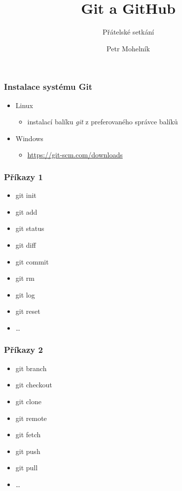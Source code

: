 \documentclass[10pt, compress]{beamer}
\title{Git a GitHub}
\subtitle{Přátelské setkání}
\author{Petr Mohelník}
\institute{}
\begin{document}




\begin{frame}[fragile]
\frametitle{Instalace systému Git}
	\begin{itemize}
	\item Linux
      \begin{itemize}
      \item instalací balíku \emph{git} z preferovaného správce balíků
      \end{itemize}
    \item Windows
    	\begin{itemize}
    	\item \url{https://git-scm.com/downloads}
    	\end{itemize}
	\end{itemize}
\end{frame}

\begin{frame}[fragile]
\frametitle{Příkazy 1}
	\begin{itemize}
		\item git init
        \item git add
        \item git status
        \item git diff
        \item git commit
        \item git rm
        \item git log
        \item git reset
        \item \dots

	\end{itemize}
\end{frame}

\begin{frame}[fragile]
\frametitle{Příkazy 2}
	\begin{itemize}
    	\item git branch
        \item git checkout
        \item git clone
        \item git remote
        \item git fetch
        \item git push
        \item git pull
        \item \dots

	\end{itemize}
\end{frame}
\end{document}
